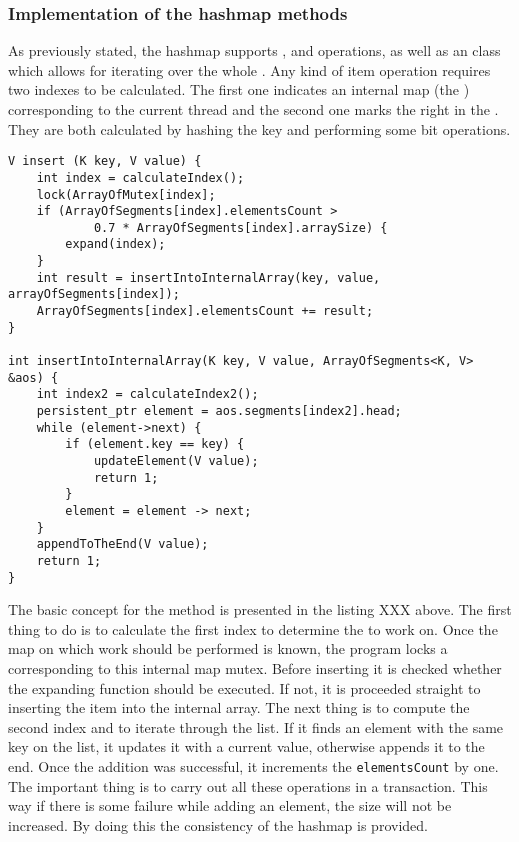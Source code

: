     \subsubsection{Implementation of the hashmap methods}
        As previously stated, the hashmap supports \insertMethod, \getMethod and \removeMethod operations, as well as an \Iterator class which allows for iterating over the whole \NvmHashMap.
        Any kind of item operation requires two indexes to be calculated. 
        The first one indicates an internal map (the \ArrayOfSegments) corresponding to the current thread and the second one marks the right \Segment in the \ArrayOfSegments. 
        They are both calculated by hashing the key and performing some bit operations.
    
\begin{lstlisting}[caption={\insertMethod method}]
V insert (K key, V value) {
    int index = calculateIndex();
    lock(ArrayOfMutex[index];
    if (ArrayOfSegments[index].elementsCount > 
            0.7 * ArrayOfSegments[index].arraySize) {
        expand(index);
    }
    int result = insertIntoInternalArray(key, value, arrayOfSegments[index]);
    ArrayOfSegments[index].elementsCount += result;
}
    
int insertIntoInternalArray(K key, V value, ArrayOfSegments<K, V> &aos) {
    int index2 = calculateIndex2();
    persistent_ptr element = aos.segments[index2].head;
    while (element->next) {
        if (element.key == key) {
            updateElement(V value);
            return 1;
        } 
        element = element -> next;
    }
    appendToTheEnd(V value);
    return 1;
}
\end{lstlisting}

        The basic concept for the \insertMethod method is presented in the listing XXX above. 
        The first thing to do is to calculate the first index to determine the \ArrayOfSegments to work on.  
        Once the map on which work should be performed is known, the program locks a corresponding to this internal map mutex. 
        Before inserting it is checked whether the expanding function should be executed. 
        If not, it is proceeded straight to inserting the item into the internal array. 
        The next thing is to compute the second index and to iterate through the list. 
        If it finds an element with the same key on the list, it updates it with a current value, otherwise appends it to the end.
        Once the addition was successful, it increments the \texttt{elementsCount} by one. 
        The important thing is to carry out all these operations in a transaction. 
        This way if there is some failure while adding an element, the size will not be increased. 
        By doing this the consistency of the hashmap is provided.
        
